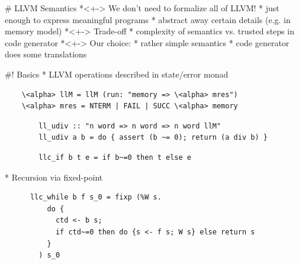 \documentclass[fleqn]{beamer}
\begin{document}
%
%


\renewcommand{\insertsectitle}{\color{green}{Kernel}}


# LLVM Semantics
  *<+-> We don't need to formalize all of LLVM!
    * just enough to express meaningful programs
    * abstract away certain details (e.g. in memory model)
  *<+-> Trade-off
    * complexity of semantics vs. trusted steps in code generator
  *<+-> Our choice:
    * rather simple semantics
    * code generator does some translations

#! Basics
  * LLVM operations described in state/error monad
    \begin{lstlisting}
    \<alpha> llM = llM (run: "memory => \<alpha> mres")
    \<alpha> mres = NTERM | FAIL | SUCC \<alpha> memory
    \end{lstlisting}

    \pause

      \begin{lstlisting}
        ll_udiv :: "n word => n word => n word llM"
        ll_udiv a b = do { assert (b ~= 0); return (a div b) }
      \end{lstlisting}

    \pause

      \begin{lstlisting}
        llc_if b t e = if b~=0 then t else e
      \end{lstlisting}

    \pause

  * Recursion via fixed-point
    \begin{lstlisting}
      llc_while b f s_0 = fixp (%W s.
          do {
            ctd <- b s;
            if ctd~=0 then do {s <- f s; W s} else return s
          }
        ) s_0
    \end{lstlisting}



%



%
\end{document}
